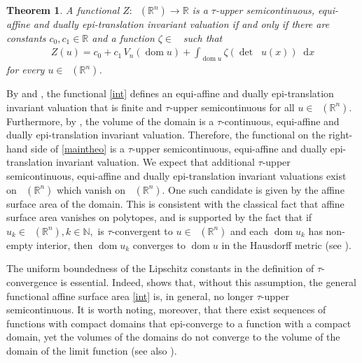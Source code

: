 \documentclass[11pt]{article}
\newtheorem{teo}{Theorem}
\theoremstyle{definition} %
\newcommand{\dif}{\mathop{}\!\mathrm{d}}
\newcommand{\RR}{(\mathbb{R}^n)}
\DeclareMathOperator{\dom}{dom}
\DeclareMathOperator{\D}{D^2}
\DeclareMathOperator{\LC}{Conv_{ld}}
\DeclareMathOperator{\LP}{Conv_{lp}}
\DeclareMathOperator{\conc}{Conc([0,\infty))}
\begin{document}
\begin{teo}\label{equiv}
A functional $Z: \LP\RR\rightarrow\mathbb{R}$ is a $\tau$-upper semicontinuous, equi-affine  and dually epi-translation invariant valuation if and only if there are  constants $c_0,c_1\in\mathbb{R}$ and a function $\zeta\in\conc$ such that
\begin{align}\label{maintheo}
Z(u)= c_0+c_1\,V_n(\dom u) +\int_{\dom u}\zeta(\det \D u(x))\dif x
\end{align}
for every $u\in \LP\RR$.
\end{teo}  
By \cite[Theorem 1]{baetaludwigsemicontinuity} and \cite[Lemma 12]{baeta1d}, the functional \eqref{int} defines an equi-affine and dually epi-translation invariant valuation that is finite and $\tau$-upper semicontinuous for all $u\in\LP(\mathbb{R}^n)$. Furthermore, by \cite[Lemma~6 and Lemma~9]{baeta1d}, the volume of the domain is a $\tau$-continuous, equi-affine and dually epi-translation invariant valuation. Therefore, the functional on the right-hand side of \eqref{maintheo} is a $\tau$-upper semicontinuous, equi-affine and dually epi-translation invariant valuation. We expect that additional $\tau$-upper semicontinuous, equi-affine and dually epi-translation invariant valuations exist on $\LC(\mathbb{R}^n)$ which vanish on $\LP(\mathbb{R}^n)$. One such candidate is given by the affine surface area of the domain. This is consistent with the classical fact that affine surface area vanishes on polytopes, and is supported by the fact that if $u_k\in \LC(\mathbb{R}^n), k\in\mathbb{N}, $ is $\tau$-convergent to $u\in \LC(\mathbb{R}^n)$ and each $\dom u_k$ has non-empty interior, then $\dom u_k$ converges to $\dom u$ in the Hausdorff metric (see \cite[Lemma~9]{baeta1d}).

The uniform boundedness of the Lipschitz constants in the definition of $\tau$-convergence is essential. Indeed, \cite[Example~1]{baetaludwigsemicontinuity} shows that, without this assumption, the general functional affine surface area \eqref{int} is, in general, no longer $\tau$-upper semicontinuous. It is worth noting, moreover, that there exist sequences of functions with compact domains that epi-converge to a function with a compact domain, yet the volumes of the domains do not converge to the volume of the domain of the limit function (see also \cite[Example~1]{baetaludwigsemicontinuity}).
\end{document}
